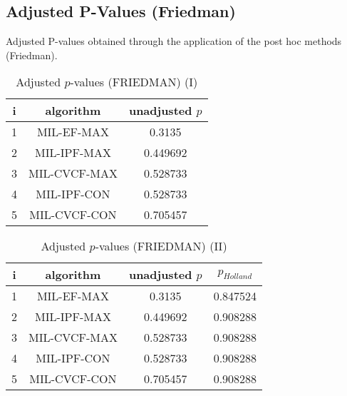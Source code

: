 \documentclass[a4paper,10pt]{article}
\begin{document}
\begin{landscape}
\newpage

\section{Adjusted P-Values (Friedman)}


Adjusted P-values obtained through the application of the post hoc methods (Friedman).

\begin{table}[!htp]
\centering\small
\begin{tabular}{ccc}
i&algorithm&unadjusted $p$\\
\hline1&MIL-EF-MAX&0.3135\\2&MIL-IPF-MAX&0.449692\\3&MIL-CVCF-MAX&0.528733\\4&MIL-IPF-CON&0.528733\\5&MIL-CVCF-CON&0.705457\\\hline
\end{tabular}
\caption{Adjusted $p$-values (FRIEDMAN) (I)}
\end{table}
\begin{table}[!htp]
\centering\small
\begin{tabular}{cccc}
i&algorithm&unadjusted $p$&$p_{Holland}$\\
\hline1&MIL-EF-MAX&0.3135&0.847524\\2&MIL-IPF-MAX&0.449692&0.908288\\3&MIL-CVCF-MAX&0.528733&0.908288\\4&MIL-IPF-CON&0.528733&0.908288\\5&MIL-CVCF-CON&0.705457&0.908288\\\hline
\end{tabular}
\caption{Adjusted $p$-values (FRIEDMAN) (II)}
\end{table}

\newpage
\end{landscape}
\end{document}
